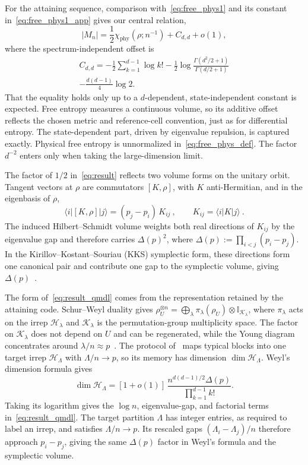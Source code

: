 \documentclass[aps,prl,twocolumn,superscriptaddress,amsmath,amssymb,reprint,longbibliography]{revtex4-2}
\newcommand{\ket}[1]{| #1 \rangle}
\newcommand{\bra}[1]{\langle #1 |}
\def\id{\mathbb{I}}
\begin{document}
For the attaining sequence, comparison with~\eqref{eq:free_phys1} and its constant in~\eqref{eq:free_phys1_app} gives our central relation,
\begin{equation}\label{eq:result}
    |M_n|=\frac12\chi_\mathrm{phy}(\rho;n^{-1})+C_{d,d}+o(1),
\end{equation}
where the spectrum-independent offset is
\begin{multline}\label{eq:result_const}
    C_{d,d}=-\frac12\sum_{k=1}^{d-1}\log k!
    -\frac12\log\frac{\Gamma(d^2/2+1)}{\Gamma(d/2+1)}\\
    -\frac{d(d-1)}4\log2.
\end{multline}
That the equality holds only up to a $d$-dependent, state-independent constant is expected. Free entropy measures a continuous volume, so its additive offset reflects the chosen metric and reference-cell convention, just as for differential entropy. The state-dependent part, driven by eigenvalue repulsion, is captured exactly. Physical free entropy is unnormalized in~\eqref{eq:free_phys_def}. The factor $d^{-2}$ enters only when taking the large-dimension limit.



The factor of $1/2$ in~\eqref{eq:result} reflects two volume forms on the unitary orbit. Tangent vectors at $\rho$ are commutators $[K,\rho]$, with $K$ anti-Hermitian, and in the eigenbasis of $\rho$,
\[
\bra{i}[K,\rho]\ket{j}=(p_j-p_i)\,K_{ij}\ ,\qquad K_{ij}=\bra{i}K\ket{j}\ .
\]
The induced Hilbert--Schmidt volume weights both real directions of $K_{ij}$ by the eigenvalue gap and therefore carries $\Delta(p)^2$, where $\Delta(p):=\prod_{i<j}(p_i-p_j)$. In the Kirillov--Kostant--Souriau (KKS) symplectic form, these directions form one canonical pair and contribute one gap to the symplectic volume, giving $\Delta(p)$~\cite{kirillov2004orbit}.

The form of~\eqref{eq:result_qmdl} comes from the representation retained by the attaining code. Schur--Weyl duality gives $\rho_U^{\otimes n}=\bigoplus_\lambda\pi_\lambda(\rho_U)\otimes\id_{\mathcal K_\lambda}$, where $\pi_\lambda$ acts on the irrep $\mathcal H_\lambda$ and $\mathcal K_\lambda$ is the permutation-group multiplicity space. The factor on $\mathcal K_\lambda$ does not depend on $U$ and can be regenerated, while the Young diagram concentrates around $\lambda/n\approx p$~\cite{keyl2001estimating}. The protocol of~\cite{paper2} maps typical blocks into one target irrep $\mathcal H_\Lambda$ with $\Lambda/n\to p$, so its memory has dimension $\dim\mathcal H_\Lambda$. Weyl's dimension formula gives~\cite{fulton1991representation}
\begin{equation}\label{eq:weyl_geometry}
\dim\mathcal H_\Lambda=[1+o(1)]\,
\frac{n^{d(d-1)/2}\Delta(p)}{\prod_{k=1}^{d-1}k!}.
\end{equation}
Taking its logarithm gives the $\log n$, eigenvalue-gap, and factorial terms in~\eqref{eq:result_qmdl}.  The target partition $\Lambda$ has integer entries, as required to label an irrep, and satisfies $\Lambda/n\to p$. Its rescaled gaps $(\Lambda_i-\Lambda_j)/n$ therefore approach $p_i-p_j$, giving the same $\Delta(p)$ factor in Weyl's formula and the symplectic volume.
\end{document}
